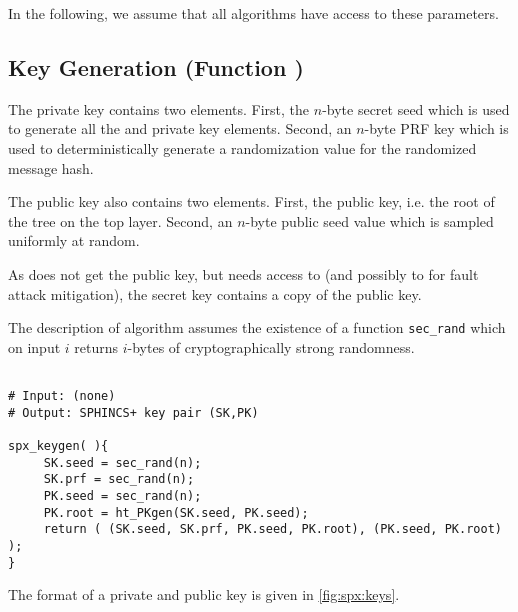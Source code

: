 In the following, we assume that all algorithms have access to these parameters.

\subsection{\spx Key Generation (Function \spxkgen)}

   The \spx private key contains two elements. First, the $n$-byte secret seed
   \sseed which is used to generate all the \wotsp and \fors private key elements.
   Second, an $n$-byte PRF key \skprf which is used to deterministically
   generate a randomization value for the randomized message hash.

   The \spx public key also contains two elements. First, the \hyper public key,
   i.e. the root of the tree on the top layer. Second, an $n$-byte public seed
   value \pseed which is sampled uniformly at random.

   As \spxsign does not get the public key, but needs access to \pseed (and
   possibly to \proot for fault attack mitigation), the \spx secret key contains
   a copy of the public key.

   The description of algorithm \spxkgen assumes the existence of a function
   \texttt{sec\_rand} which on input $i$ returns $i$-bytes of cryptographically strong
   randomness.

\begin{lstlisting}[label=alg:spx:pkgen, language=pseudoc,
                   caption=\spxkgen\ -- Generate a \spx key pair.]

# Input: (none)
# Output: SPHINCS+ key pair (SK,PK)

spx_keygen( ){
     SK.seed = sec_rand(n);
     SK.prf = sec_rand(n);
     PK.seed = sec_rand(n);
     PK.root = ht_PKgen(SK.seed, PK.seed);
     return ( (SK.seed, SK.prf, PK.seed, PK.root), (PK.seed, PK.root) );
}

\end{lstlisting}

    The format of a \spx private and public key is given in \autoref{fig:spx:keys}.


